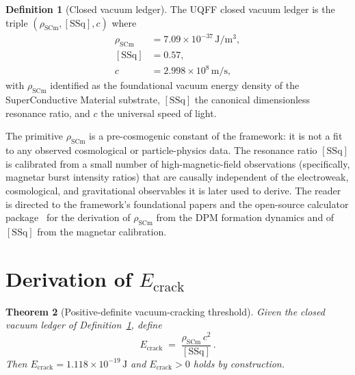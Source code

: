\documentclass[11pt,a4paper,onecolumn]{article}
\theoremstyle{plain}
\newtheorem{theorem}{Theorem}
\theoremstyle{definition}
\newtheorem{definition}[theorem]{Definition}
\theoremstyle{remark}
\begin{document}
\begin{definition}[Closed vacuum ledger]\label{def:ledger}
The UQFF closed vacuum ledger is the triple
$(\rho_{\mathrm{SCm}}, [\mathrm{SSq}], c)$ where
\begin{align*}
\rho_{\mathrm{SCm}} &= 7.09 \times 10^{-37}\,\mathrm{J/m^3}, \\
[\mathrm{SSq}]      &= 0.57, \\
c                   &= 2.998 \times 10^8\,\mathrm{m/s},
\end{align*}
with $\rho_{\mathrm{SCm}}$ identified as the foundational vacuum
energy density of the SuperConductive Material substrate,
$[\mathrm{SSq}]$ the canonical dimensionless resonance ratio, and $c$
the universal speed of light.
\end{definition}

The primitive $\rho_{\mathrm{SCm}}$ is a pre-cosmogenic constant of
the framework: it is not a fit to any observed cosmological or
particle-physics data. The resonance ratio $[\mathrm{SSq}]$ is
calibrated from a small number of high-magnetic-field observations
(specifically, magnetar burst intensity ratios) that are causally
independent of the electroweak, cosmological, and gravitational
observables it is later used to derive. The reader is directed to
the framework's foundational papers and the open-source calculator
package~\cite{murphy2026uqff} for the derivation of $\rho_{\mathrm{SCm}}$
from the DPM formation dynamics and of $[\mathrm{SSq}]$ from the
magnetar calibration.

\section{Derivation of $E_{\text{crack}}$}\label{sec:derivation}

\begin{theorem}[Positive-definite vacuum-cracking threshold]
\label{thm:e_crack_positive}
Given the closed vacuum ledger of Definition~\ref{def:ledger}, define
\begin{equation}\label{eq:e_crack}
E_{\text{crack}} \;=\; \frac{\rho_{\mathrm{SCm}} \, c^2}{[\mathrm{SSq}]}\,.
\end{equation}
Then $E_{\text{crack}} = 1.118 \times 10^{-19}\,\mathrm{J}$ and
$E_{\text{crack}} > 0$ holds by construction.
\end{theorem}
\end{document}
